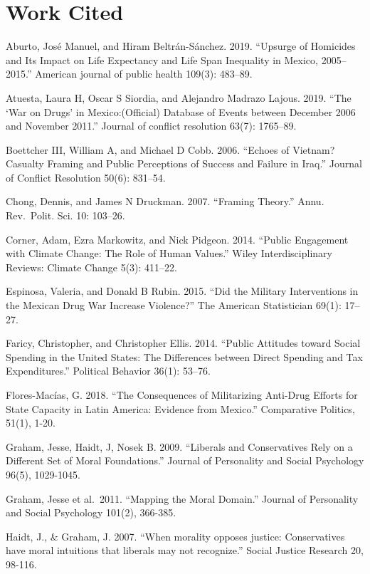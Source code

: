 \documentclass[
  12pt,
]{article}
\begin{document}
\hypertarget{work-cited}{%
\section{Work Cited}\label{work-cited}}

Aburto, José Manuel, and Hiram Beltrán-Sánchez. 2019. ``Upsurge of
Homicides and Its Impact on Life Expectancy and Life Span Inequality in
Mexico, 2005--2015.'' American journal of public health 109(3): 483--89.

Atuesta, Laura H, Oscar S Siordia, and Alejandro Madrazo Lajous. 2019.
``The `War on Drugs' in Mexico:(Official) Database of Events between
December 2006 and November 2011.'' Journal of conflict resolution 63(7):
1765--89.

Boettcher III, William A, and Michael D Cobb. 2006. ``Echoes of Vietnam?
Casualty Framing and Public Perceptions of Success and Failure in
Iraq.'' Journal of Conflict Resolution 50(6): 831--54.

Chong, Dennis, and James N Druckman. 2007. ``Framing Theory.'' Annu.
Rev.~Polit. Sci. 10: 103--26.

Corner, Adam, Ezra Markowitz, and Nick Pidgeon. 2014. ``Public
Engagement with Climate Change: The Role of Human Values.'' Wiley
Interdisciplinary Reviews: Climate Change 5(3): 411--22.

Espinosa, Valeria, and Donald B Rubin. 2015. ``Did the Military
Interventions in the Mexican Drug War Increase Violence?'' The American
Statistician 69(1): 17--27.

Faricy, Christopher, and Christopher Ellis. 2014. ``Public Attitudes
toward Social Spending in the United States: The Differences between
Direct Spending and Tax Expenditures.'' Political Behavior 36(1):
53--76.

Flores-Macías, G. 2018. ``The Consequences of Militarizing Anti-Drug
Efforts for State Capacity in Latin America: Evidence from Mexico.''
Comparative Politics, 51(1), 1-20.

Graham, Jesse, Haidt, J, Nosek B. 2009. ``Liberals and Conservatives
Rely on a Different Set of Moral Foundations.'' Journal of Personality
and Social Psychology 96(5), 1029-1045.

Graham, Jesse et al.~2011. ``Mapping the Moral Domain.'' Journal of
Personality and Social Psychology 101(2), 366-385.

Haidt, J., \& Graham, J. 2007. ``When morality opposes justice:
Conservatives have moral intuitions that liberals may not recognize.''
Social Justice Research 20, 98-116.
\end{document}
